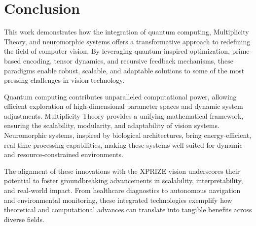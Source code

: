\documentclass{article}
\theoremstyle{plain}
\begin{document}
\section{Conclusion}

This work demonstrates how the integration of quantum computing, Multiplicity Theory, and neuromorphic systems offers a transformative approach to redefining the field of computer vision. By leveraging quantum-inspired optimization, prime-based encoding, tensor dynamics, and recursive feedback mechanisms, these paradigms enable robust, scalable, and adaptable solutions to some of the most pressing challenges in vision technology.

Quantum computing contributes unparalleled computational power, allowing efficient exploration of high-dimensional parameter spaces and dynamic system adjustments. Multiplicity Theory provides a unifying mathematical framework, ensuring the scalability, modularity, and adaptability of vision systems. Neuromorphic systems, inspired by biological architectures, bring energy-efficient, real-time processing capabilities, making these systems well-suited for dynamic and resource-constrained environments.

The alignment of these innovations with the XPRIZE vision underscores their potential to foster groundbreaking advancements in scalability, interpretability, and real-world impact. From healthcare diagnostics to autonomous navigation and environmental monitoring, these integrated technologies exemplify how theoretical and computational advances can translate into tangible benefits across diverse fields.

\nocite{*}


\end{document}
